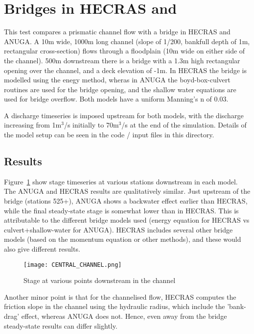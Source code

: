 \section{Bridges in HECRAS and \anuga{}}
This test compares a prismatic channel flow with a bridge in HECRAS and ANUGA.
A 10m wide, 1000m long channel (slope of 1/200, bankfull depth of 1m,
rectangular cross-section) flows through a floodplain (10m wide on either side
of the channel). 500m downstream there is a bridge with a 1.3m high rectangular
opening over the channel, and a deck elevation of -1m. In HECRAS the bridge is
modelled using the enegy method, wheras in ANUGA the boyd-box-culvert routines
are used for the bridge opening, and the shallow water equations are used for
bridge overflow. Both models have a uniform Manning's n of 0.03. 

A discharge timeseries is imposed upstream for both models, with the discharge
increasing from 1m$^3$/s initially to 70m$^3$/s at the end of the simulation.
Details of the model setup can be seen in the code / input files in this
directory.

\subsection{Results}

Figure~\ref{Reach} show stage timeseries at various stations downstream in each model.
The ANUGA and HECRAS results are qualitatively similar. Just upstream of the
bridge (stations 525+), ANUGA shows a backwater effect earlier than HECRAS,
while the final steady-state stage is somewhat lower than in HECRAS. This is
attributable to the different bridge models used (energy equation for HECRAS vs
culvert+shallow-water for ANUGA). HECRAS includes several other bridge models
(based on the momentum equation or other methods), and these would also give
different results. 

\begin{figure}
\begin{center}
\texttt{[image: CENTRAL\_CHANNEL.png]}
\end{center}
\caption{Stage at various points downstream in the channel}
\label{Reach}
\end{figure}

Another minor point is that for the channelised flow, HECRAS computes the
friction slope in the channel using the hydraulic radius, which include the
'bank-drag' effect, whereas ANUGA does not. Hence, even away from the bridge
steady-state results can differ slightly.

